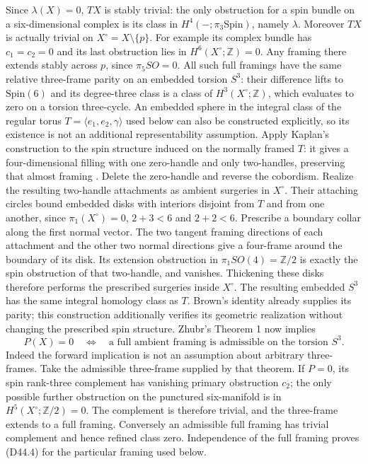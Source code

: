 Since $\lambda(X)=0$, $TX$ is stably trivial: the only obstruction
for a spin bundle on a six-dimensional complex is its class in
$H^4(-;\pi_3\mathrm{Spin})$, namely $\lambda$.
Moreover $TX$ is actually trivial on $X^\circ=X\setminus\{p\}$.
For example its complex bundle has $c_1=c_2=0$ and its last
obstruction lies in $H^6(X^\circ;\mathbb Z)=0$.
Any framing there extends stably across $p$, since
$\pi_5SO=0$. All such full framings have the same relative
three-frame parity on an embedded torsion $S^3$: their difference
lifts to $\mathrm{Spin}(6)$ and its degree-three class is a class
of $H^3(X^\circ;\mathbb Z)$, which evaluates to zero on a torsion
three-cycle.
An embedded sphere in the integral class of the regular torus
$T=\langle e_1,e_2,\gamma\rangle$ used below can also be
constructed explicitly, so its existence is not an additional
representability assumption. Apply Kaplan's construction to
the spin structure induced on the normally framed $T$:
it gives a four-dimensional filling with one zero-handle and
only two-handles, preserving that almost framing
\cite[Definition 1.7, Remark 1.8, Theorem 3.1]{mapsKaplan79}.
Delete the zero-handle and reverse the cobordism. Realize the
resulting two-handle attachments as ambient surgeries in
$X^\circ$. Their attaching circles bound embedded disks
with interiors disjoint from $T$ and from one another, since
$\pi_1(X^\circ)=0$, $2+3<6$ and $2+2<6$.
Prescribe a boundary collar along the first normal vector.
The two tangent framing directions of each attachment and
the other two normal directions give a four-frame around
the boundary of its disk. Its extension obstruction in
$\pi_1SO(4)=\mathbb Z/2$ is exactly the spin obstruction
of that two-handle, and vanishes. Thickening these disks
therefore performs the prescribed surgeries inside $X^\circ$.
The resulting embedded $S^3$ has the same integral homology
class as $T$. Brown's identity already supplies its parity;
this construction additionally verifies its geometric
realization without changing the prescribed spin structure.
Zhubr's Theorem 1 now implies
\[
 P(X)=0\quad\Longleftrightarrow\quad
 \text{a full ambient framing is admissible on the torsion }S^3.
                                                               \tag{D44.4}
\]
Indeed the forward implication is not an assumption about arbitrary
three-frames. Take the admissible three-frame supplied by that
theorem. If $P=0$, its spin rank-three complement has vanishing
primary obstruction $c_2$; the only possible further obstruction
on the punctured six-manifold is in $H^5(X^\circ;\mathbb Z/2)=0$.
The complement is therefore trivial, and the three-frame extends
to a full framing. Conversely an admissible full framing has
trivial complement and hence refined class zero. Independence
of the full framing proves (D44.4) for the particular framing
used below.

